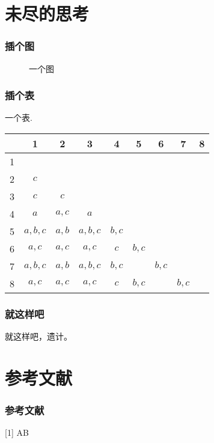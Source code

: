 \documentclass[CJK,notheorems,mathserif,table]{beamer}
\begin{document}
\begin{CJK*}{GBK}{kai}
\section{未尽的思考}
\begin{frame}\frametitle{插个图}
\begin{figure}[!htbp]
\centering
\caption{一个图}
\end{figure}
\end{frame}
\begin{frame}\frametitle{插个表}
一个表.
 \begin{table}
  \centering \addtolength{\tabcolsep}{1mm}
 \begin{tabular}{ccccccccc}
   \hline
        & 1 & 2 & 3 & 4 & 5 & 6 & 7 & 8 \\
   \hline
   1 &         &       &          &       &       &       &       &  \\
   2 & $c$     &       &          &       &       &       &       &  \\
   3 & $c$     & $c $  &          &       &       &       &       &  \\
   4 & $a$     & $a,c$ & $a $     &       &       &       &       &  \\
   5 & $a,b,c$ & $a,b$ & $a,b,c$  & $b,c$ &       &       &       &  \\
   6 & $a,c$   & $a,c$ & $a,c$    & $c $  & $b,c$ &       &       &  \\
   7 & $a,b,c$ & $a,b$ & $a,b,c$  & $b,c$ &       & $b,c$ &       &  \\
   8 & $a,c$   & $a,c$ & $a,c$    & $c$   & $b,c$ &       & $b,c$ &  \\
   \hline
 \end{tabular}\label{dismatrix}
 \end{table}
\end{frame}
\begin{frame}\frametitle{就这样吧}
就这样吧，遗计。
\end{frame}
\section{参考文献}
\begin{frame}\frametitle{参考文献}
[1] A\newline
[2] B
\end{frame}

\end{CJK*}
\end{document}
